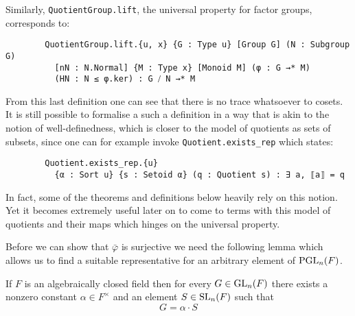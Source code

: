 \begin{remark}
    Similarly, \texttt{QuotientGroup.lift}, the universal property for factor groups, corresponds to:

    \begin{footnotesize}
    \begin{verbatim}
        QuotientGroup.lift.{u, x} {G : Type u} [Group G] (N : Subgroup G) 
          [nN : N.Normal] {M : Type x} [Monoid M] (φ : G →* M)
          (HN : N ≤ φ.ker) : G ⧸ N →* M
    \end{verbatim}
    \end{footnotesize}

    From this last definition one can see that there is no trace whatsoever to cosets. It is still possible to formalise a such a
    definition in a way that is akin to the notion of well-definedness, which is closer to the model of quotients as sets of subsets,
    since one can for example invoke \texttt{Quotient.exists_rep} which states:

    \begin{footnotesize}
    \begin{verbatim}
        Quotient.exists_rep.{u} 
          {α : Sort u} {s : Setoid α} (q : Quotient s) : ∃ a, ⟦a⟧ = q
    \end{verbatim}
    \end{footnotesize}    
    
    In fact, some of the theorems and definitions below heavily rely on this notion.
    Yet it becomes extremely useful later on to come to terms with this model of quotients and their maps which
    hinges on the universal property.
    \end{remark}

Before we can show that $\bar{\varphi}$ is surjective we need the following
lemma which allows us to find a suitable representative for an arbitrary element of $\operatorname{PGL}_n(F)$.

\begin{lemma}
\label{exists_SL_eq_scaled_GL_of_IsAlgClosed}
\leanok
If $F$ is an algebraically closed field then for every $G \in \operatorname{GL}_n(F)$ there exists a nonzero constant $\alpha \in F^\times$ and an element $S \in \operatorname{SL}_n(F)$ such that 
\begin{equation*}
    G = \alpha \cdot S
\end{equation*}
\end{lemma}

